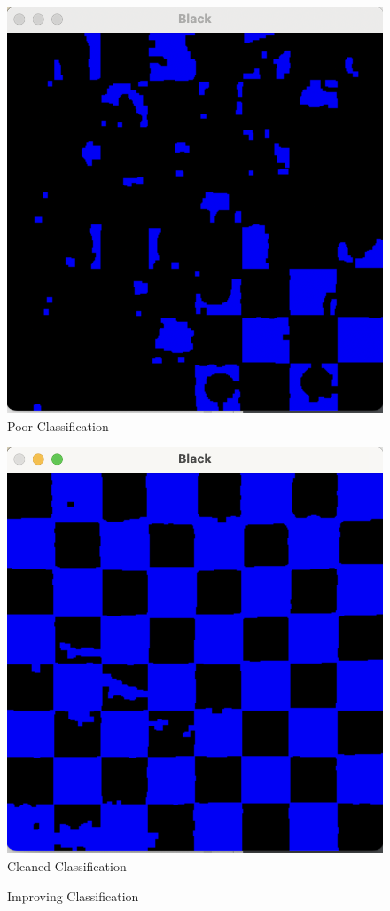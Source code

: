 \documentclass[11pt]{article}
\begin{document}
    \begin{figure}
        \begin{minipage}[c]{0.4\linewidth}
            \centering
            \includegraphics[scale=0.3]{Bad-Black-Squares.png}
            \newline
            Poor Classification
        \end{minipage}\hfill
        \begin{minipage}[c]{0.4\linewidth}
            \centering
            \includegraphics[scale=0.3]{Good-Black-Squares.png}
            Cleaned Classification
        \end{minipage}
        \caption{Improving Classification}
    \end{figure}
\end{document}
